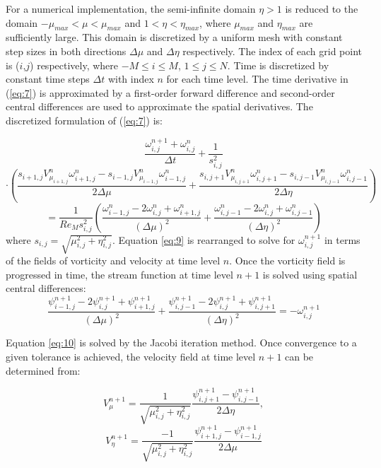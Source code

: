 For a numerical implementation, the semi-infinite domain $\eta > 1$ is reduced to the domain $-\mu_{max} < \mu < \mu_{max}$ and $1 < \eta < \eta_{max}$, where $\mu_{max}$ and $\eta_{max}$ are sufficiently large. This domain is discretized by a uniform mesh with constant step sizes in both directions $\Delta \mu$ and $\Delta \eta$ respectively. The index of each grid point is ($i$,$j$) respectively, where $-M \le i \le M$, $1 \le j \le N$. Time is discretized by constant time steps $\Delta t$ with index $n$ for each time level. The time
derivative in
(\ref{eq:7})
is approximated by a first-order forward difference and second-order central
differences are used to approximate the spatial derivatives. The discretized formulation of (\ref{eq:7}) is:

\[
\frac{\omega^{n+1}_{i,j}+\omega^n_{i,j}}{\Delta t} + \frac{1}{s^2_{i,j}}
\]
\[
\cdot \left(
\frac{s_{i+1,j}V^n_{\mu_{i+1,j}}\omega^n_{i+1,j}-s_{i-1,j}V^n_{\mu_{i-1,j}}\omega^n_{i-1,j}}
     {2\Delta\mu}
+
\frac{s_{i,j+1}V^n_{\mu_{i,j+1}}\omega^n_{i,j+1}-s_{i,j-1}V^n_{\mu_{i,j-1}}\omega^n_{i,j-1}}
     {2\Delta\eta}
\right)
\]
\begin{equation}
\label{eq:9}
=\frac{1}{Re_M s^2_{i,j}}
\left(
\frac{\omega^n_{i-1,j}-2\omega^n_{i,j}+\omega^n_{i+1,j}}{(\Delta\mu)^2}
+
\frac{\omega^n_{i,j-1}-2\omega^n_{i,j}+\omega^n_{i,j-1}}{(\Delta\eta)^2}
\right)
\end{equation}
where $s_{i,j}=\sqrt{\mu^2_{i,j}+\eta^2_{i,j}}$.
Equation \ref{eq:9} is rearranged to solve for $\omega^{n+1}_{i,j}$ in terms of the fields of
vorticity and velocity at time level $n$.
Once the vorticity field is progressed in time, the stream
function at time level $n+1$ is solved using spatial central differences:
\begin{equation}
\label{eq:10}
\frac{\psi^{n+1}_{i-1,j}-2\psi^{n+1}_{i,j}+\psi^{n+1}_{i+1,j}}{(\Delta\mu)^2}+
\frac{\psi^{n+1}_{i,j-1}-2\psi^{n+1}_{i,j}+\psi^{n+1}_{i,j+1}}{(\Delta\eta)^2}
=-\omega^{n+1}_{i,j}
\end{equation}

Equation \ref{eq:10} is solved by the Jacobi iteration method. Once convergence to a given tolerance is achieved, the velocity field at time level $n+1$ can be determined from:

\[
V_\mu^{n+1}=\frac{1}{\sqrt{\mu_{i,j}^2+\eta_{i,j}^2}} \frac{\psi_{i,j+1}^{n+1} - \psi_{i,j-1}^{n+1}}{2\Delta \eta},
\]
\begin{equation}
\label{eq:11}
V_\eta^{n+1}=\frac{-1}{\sqrt{\mu_{i,j}^2+\eta_{i,j}^2}} \frac{\psi_{i+1,j}^{n+1} - \psi_{i-1,j}^{n+1}}{2\Delta \mu}
\end{equation}

